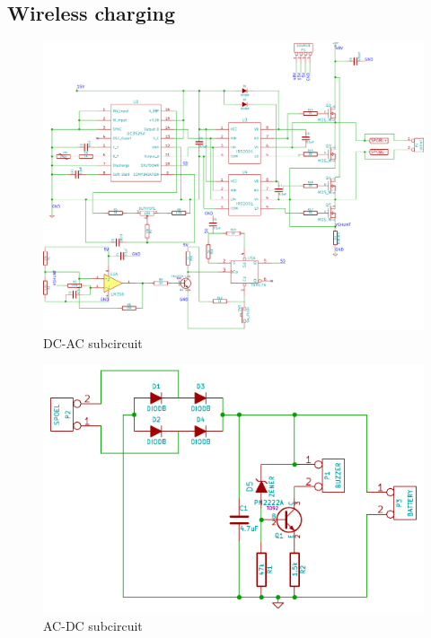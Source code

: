 \documentclass[final]{scrreprt} %
\begin{document}
\begin{appendices}
\renewcommand{\chapternumber}{\appendixname\space\thechapter} 
\chapter{Wireless charging}
\label{app:wireless}
\begin{figure}[h]
	\includegraphics[width=\linewidth]{resources/DC-AC-rc.pdf}
	\caption{DC-AC subcircuit}
	\label{fig:DC-AC}
\end{figure}

\begin{figure}[h]
	\includegraphics[width=\linewidth]{resources/AC-DC-rc.pdf}
	\caption{AC-DC subcircuit}
	\label{fig:AC-DC}
\end{figure}


\end{appendices}
\end{document}
